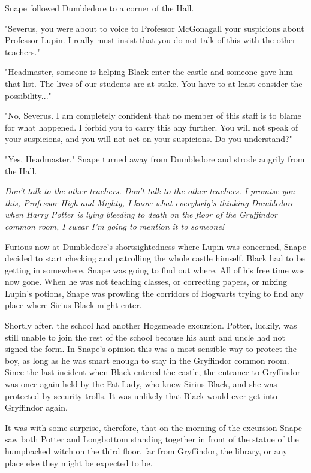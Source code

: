 Snape followed Dumbledore to a corner of the Hall.

"Severus, you were about to voice to Professor McGonagall your suspicions about Professor Lupin. I really must insist that you do not talk of this with the other teachers."

"Headmaster, someone is helping Black enter the castle and someone gave him that list. The lives of our students are at stake. You have to at least consider the possibility..."

"No, Severus. I am completely confident that no member of this staff is to blame for what happened. I forbid you to carry this any further. You will not speak of your suspicions, and you will not act on your suspicions. Do you understand?"

"Yes, Headmaster." Snape turned away from Dumbledore and strode angrily from the Hall.

\emph{Don't talk to the other teachers. Don't talk to the other teachers. I promise you this, Professor High-and-Mighty, I-know-what-everybody's-thinking Dumbledore - when Harry Potter is lying bleeding to death on the floor of the Gryffindor common room, I swear I'm going to mention it to someone!}

Furious now at Dumbledore's shortsightedness where Lupin was concerned, Snape decided to start checking and patrolling the whole castle himself. Black had to be getting in somewhere. Snape was going to find out where. All of his free time was now gone. When he was not teaching classes, or correcting papers, or mixing Lupin's potions, Snape was prowling the corridors of Hogwarts trying to find any place where Sirius Black might enter.

Shortly after, the school had another Hogsmeade excursion. Potter, luckily, was still unable to join the rest of the school because his aunt and uncle had not signed the form. In Snape's opinion this was a most sensible way to protect the boy, as long as he was smart enough to stay in the Gryffindor common room. Since the last incident when Black entered the castle, the entrance to Gryffindor was once again held by the Fat Lady, who knew Sirius Black, and she was protected by security trolls. It was unlikely that Black would ever get into Gryffindor again.

It was with some surprise, therefore, that on the morning of the excursion Snape saw both Potter and Longbottom standing together in front of the statue of the humpbacked witch on the third floor, far from Gryffindor, the library, or any place else they might be expected to be.

